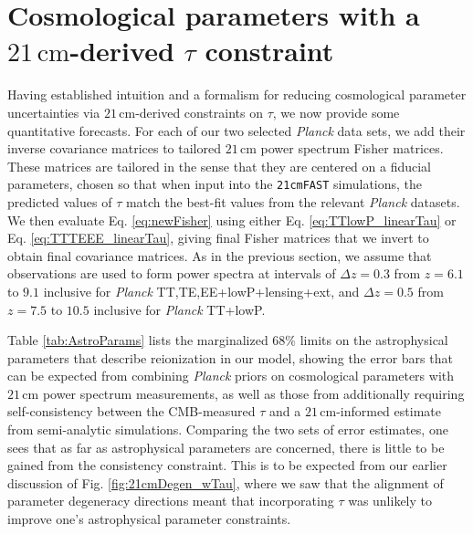 \documentclass[twocolumn,aps,prd,nofootinbib,showpacs]{revtex4-1}
\begin{document}
\section{Cosmological parameters with a $21\,\textrm{cm}$-derived $\tau$ constraint}
\label{sec:CMBresults}

Having established intuition and a formalism for reducing cosmological parameter uncertainties via $21\,\textrm{cm}$-derived constraints on $\tau$, we now provide some quantitative forecasts. For each of our two selected \emph{Planck} data sets, we add their inverse covariance matrices to tailored $21\,\textrm{cm}$ power spectrum Fisher matrices. These matrices are tailored in the sense that they are centered on a fiducial parameters, chosen so that when input into the {\tt 21cmFAST} simulations, the predicted values of $\tau$ match the best-fit values from the relevant \emph{Planck} datasets. We then evaluate Eq. \eqref{eq:newFisher} using either Eq. \eqref{eq:TTlowP_linearTau} or Eq. \eqref{eq:TTTEEE_linearTau}, giving final Fisher matrices that we invert to obtain final covariance matrices. As in the previous section, we assume that observations are used to form power spectra at intervals of $\Delta z = 0.3$ from $z = 6.1$ to $9.1$ inclusive for \emph{Planck} TT,TE,EE+lowP+lensing+ext, and $\Delta z = 0.5$ from $z=7.5$ to $10.5$ inclusive for \emph{Planck} TT+lowP.

Table \ref{tab:AstroParams} lists the marginalized $68\%$ limits on the astrophysical parameters that describe reionization in our model, showing the error bars that can be expected from combining \emph{Planck} priors on cosmological parameters with $21\,\textrm{cm}$ power spectrum measurements, as well as those from additionally requiring self-consistency between the CMB-measured $\tau$ and a $21\,\textrm{cm}$-informed estimate from semi-analytic simulations. Comparing the two sets of error estimates, one sees that as far as astrophysical parameters are concerned, there is little to be gained from the consistency constraint. This is to be expected from our earlier discussion of Fig. \ref{fig:21cmDegen_wTau}, where we saw that the alignment of parameter degeneracy directions meant that incorporating $\tau$ was unlikely to improve one's astrophysical parameter constraints.
\end{document}
